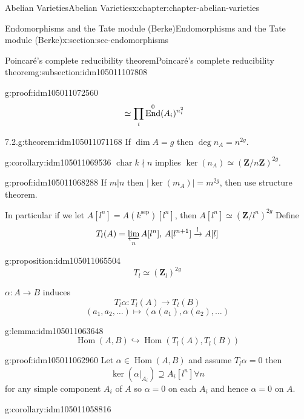 \documentclass[oneside,10pt,]{book}
\newcommand{\qedhere}{\relax}
\numberwithin{equation}{section}
\newcommand{\lb}{[}
\newcommand{\rb}{]}
\newcommand{\ZZ}{\mathbf{Z}}
\newcommand{\sep}{\mathrm{sep}}
\DeclareMathOperator{\End}{End}
\DeclareMathOperator{\Hom}{Hom}
\DeclareMathOperator{\characteristic}{char}
\newcommand{\amp}{&}
\begin{document}
\begin{chapterptx}{Abelian Varieties}{}{Abelian Varieties}{}{}{x:chapter:chapter-abelian-varieties}
\begin{sectionptx}{Endomorphisms and the Tate module (Berke)}{}{Endomorphisms and the Tate module (Berke)}{}{}{x:section:sec-endomorphisms}
\begin{subsectionptx}{Poincaré's complete reducibility theorem}{}{Poincaré's complete reducibility theorem}{}{}{g:subsection:idm105011107808}
\begin{proofptx}{}{g:proof:idm105011072560}
\begin{align*}
\amp \simeq \prod_{i} \End^0(A_i)^{n_i^2}\qedhere
\end{align*}
%
\end{proofptx}
\begin{theorem}{7.2.}{}{g:theorem:idm105011071168}%
If \(\dim A = g\) then \(\deg n_A  =n^{2g}\).%
\end{theorem}
\begin{corollary}{}{}{g:corollary:idm105011069536}%
\(\characteristic k \nmid n\) implies \(\ker(n_A) \simeq (\ZZ/n\ZZ)^{2g}\).%
\end{corollary}
\begin{proofptx}{}{g:proof:idm105011068288}
If  \(m | n\) then \(|\ker (m_A)| = m^{2g}\), then use structure theorem.%
\end{proofptx}
In particular if we let \(A\lb l^n\rb = A(k^\sep) \lb l^n\rb\), then \(A\lb l^n\rb \simeq (\ZZ/l^n)^{2g}\) Define%
\begin{equation*}
T_l(A) = \varprojlim_n A[l^n],\, A[l^{n+1}] \xrightarrow{l} A[l]
\end{equation*}
%
\begin{proposition}{}{}{g:proposition:idm105011065504}%
%
\begin{equation*}
T_l \simeq (\ZZ_l)^{2g}
\end{equation*}
%
\end{proposition}
\(\alpha \colon A \to B\) induces%
\begin{equation*}
T_l\alpha\colon T_l(A) \to T_l(B)
\end{equation*}
%
\begin{equation*}
(a_1,a_2, \ldots) \mapsto(\alpha(a_1),\alpha(a_2), \ldots)
\end{equation*}
%
\begin{lemma}{}{}{g:lemma:idm105011063648}%
%
\begin{equation*}
\Hom(A,B) \hookrightarrow \Hom(T_l(A), T_l(B))
\end{equation*}
%
\end{lemma}
\begin{proofptx}{}{g:proof:idm105011062960}
Let \(\alpha \in \Hom(A,B)\) and assume \(T_l \alpha = 0\) then%
\begin{equation*}
\ker (\alpha|_{A_i}) \supseteq A_i[l^n] \forall n
\end{equation*}
for any simple component \(A_i\) of \(A\) so \(\alpha =0\) on each \(A_i\) and hence \(\alpha = 0\) on \(A\).%
\end{proofptx}
\begin{corollary}{}{}{g:corollary:idm105011058816}%

\end{corollary}
\end{subsectionptx}
\end{sectionptx}
\end{chapterptx}
\end{document}
